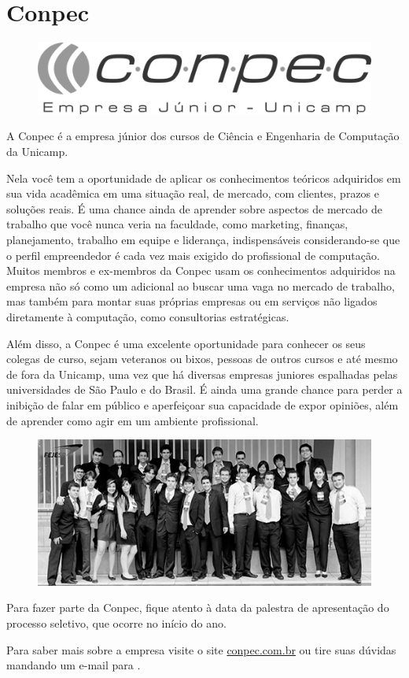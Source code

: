 
\section{Conpec}

\begin{figure}[H]
    \centering
    \includegraphics[width=.35\textwidth]{img/alem_da_graduacao/conpec_logo.png}
\end{figure}

A Conpec é a empresa júnior dos cursos de Ciência e Engenharia de Computação da
Unicamp.

Nela você tem a oportunidade de aplicar os conhecimentos teóricos adquiridos em
sua vida acadêmica em uma situação real, de mercado, com clientes, prazos e
soluções reais. É uma chance ainda de aprender sobre aspectos de mercado de
trabalho que você nunca veria na faculdade, como marketing, finanças,
planejamento, trabalho em equipe e liderança, indispensáveis considerando-se que
o perfil empreendedor é cada vez mais exigido do profissional de computação.
Muitos membros e ex-membros da Conpec usam os conhecimentos adquiridos na
empresa não só como um adicional ao buscar uma vaga no mercado de trabalho, mas
também para montar suas próprias empresas ou em serviços não ligados diretamente
à computação, como consultorias estratégicas.

Além disso, a Conpec é uma excelente oportunidade para conhecer os seus colegas
de curso, sejam veteranos ou bixos, pessoas de outros cursos e até mesmo de fora
da Unicamp, uma vez que há diversas empresas juniores espalhadas pelas
universidades de São Paulo e do Brasil. É ainda uma grande chance para perder a
inibição de falar em público e aperfeiçoar sua capacidade de expor opiniões,
além de aprender como agir em um ambiente profissional.

\begin{figure}[H]
    \centering
    \includegraphics[width=.45\textwidth]{img/alem_da_graduacao/conpec_foto.jpg}
\end{figure}

Para fazer parte da Conpec, fique atento à data da palestra de apresentação do
processo seletivo, que ocorre no início do ano.

Para saber mais sobre a empresa visite o site \url{conpec.com.br} ou tire suas
dúvidas mandando um e-mail para .
